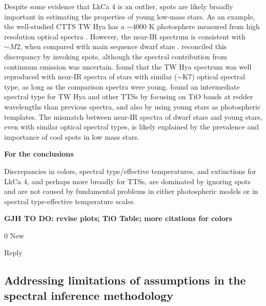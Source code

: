 \documentclass[twocolumn]{emulateapj}%
\begin{document}
Despite some evidence that LkCa 4 is an outlier, spots are likely broadly important in estimating the properties of young low-mass stars. As an example, the well-studied CTTS TW Hya has a $\sim 4000$ K photosphere measured from high resolution optical spectra \citep[e.g.][]{yang05}.  However, the near-IR spectrum is consistent with $\sim M2$, when compared with main sequence dwarf stars \citep{vacca11}.  \citet{debes13} reconciled this discrepancy by invoking spots, although the spectral contribution from continuum emission was uncertain.  \citet{mcclure13} found that the TW Hya spectrum was well reproduced with near-IR spectra of stars with similar ($\sim$K7) optical spectral type, as long as the comparison spectra were young.   \citet{herczeg14} found an intermediate spectral type for TW Hya and other TTSs by focusing on TiO bands at redder wavelengths than previous spectra, and also by using young stars as photospheric templates.  The mismatch between near-IR spectra of dwarf stars and young stars, even with similar optical spectral types, is likely explained by the prevalence and importance of cool spots in low mass stars.





{\bf For the conclusions}

Discrepancies in colors, spectral type/effective temperatures, and extinctions for LkCa 4, and perhaps more broadly for TTSs, are dominated by ignoring spots and are not caused by fundamental problems in either photospheric models or in spectral type-effective temperature scales.




{\bf GJH TO DO:  revise plots;  TiO Table; more citations for colors}

0 New

Reply


\subsection{Addressing limitations of assumptions in the spectral inference methodology}
\end{document}

